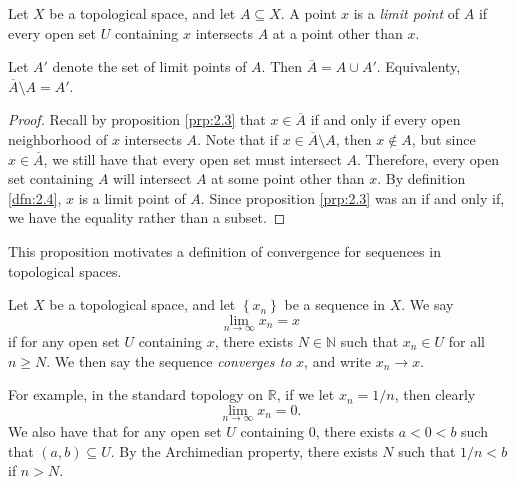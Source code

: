 
\begin{definition}\label{dfn:2.4}
	Let $X$ be a topological space, and let $A\subseteq X$. A point $x$ is a \emph{limit point} of $A$ if every open set $U$ containing $x$ intersects $A$ at a point other than $x$.
\end{definition}
\begin{proposition}\label{prp:2.4}
	Let $A'$ denote the set of limit points of $A$. Then $\overline{A} =A\cup A'$. Equivalenty, $\overline{A} \setminus A=A'$.
\end{proposition}
\begin{proof}
	Recall by proposition \ref{prp:2.3} that $x\in \overline{A} $ if and only if every open neighborhood of $x$ intersects $A$. Note that if $x\in \overline{A} \setminus A$, then $x\notin A$, but since $x\in \overline{A} $, we still have that every open set must intersect $A$. Therefore, every open set containing $A$ will intersect $A$ at some point other than $x$. By definition \ref{dfn:2.4}, $x$ is a limit point of $A$. Since proposition \ref{prp:2.3} was an if and only if, we have the equality rather than a subset.
\end{proof}

This proposition motivates a definition of convergence for sequences in topological spaces.

\begin{definition}[Convergence]\label{dfn:2.5}
	Let $X$ be a topological space, and let $\left\{ x_n \right\} $ be a sequence in $X$. We say
	\[
		\lim_{n \to \infty} x_n = x
	\]
	if for any open set $U$ containing $x$, there exists $N\in\mathbb{N} $ such that $x_n\in U$ for all $n\geq N$. We then say the sequence \emph{converges to} $x$, and write $x_n \to x$.
\end{definition}

For example, in the standard topology on $\mathbb{R} $, if we let $x_n = 1/n$, then clearly
\[
	\lim_{n \to \infty} x_n=0
.\]
We also have that for any open set $U$ containing $0$, there exists $a<0<b$ such that $(a,b)\subseteq U$. By the Archimedian property, there exists $N$ such that $1/n < b$ if $n>N$.

